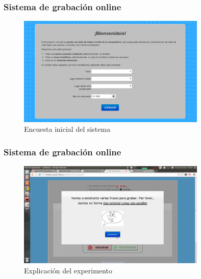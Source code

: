 \documentclass[mathserif]{beamer}%
\begin{document}
\begin{frame}
	\frametitle{Sistema de grabación online}
	
	\begin{figure}[h!]
		\centerline{\includegraphics[width=0.8\textwidth]{pag-inicio2} }
		\caption{Encuesta inicial del sistema}
		\label{figEncuesta}
	\end{figure}
\end{frame}

%	

\begin{frame}
	\frametitle{Sistema de grabación online}
	
	\begin{figure}[h!]
		\centerline{\includegraphics[width=0.8\textwidth]{pag-info2} }
		\caption{Explicación del experimento}
		\label{figEncuesta}
	\end{figure}
\end{frame}
\end{document}
